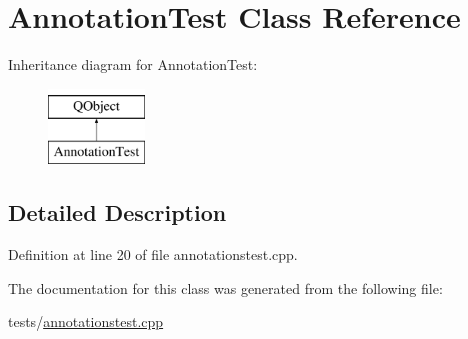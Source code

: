 \hypertarget{classAnnotationTest}{\section{Annotation\+Test Class Reference}
\label{classAnnotationTest}
}
Inheritance diagram for Annotation\+Test\+:\begin{figure}[H]
\begin{center}
\leavevmode
\includegraphics[height=2.000000cm]{classAnnotationTest}
\end{center}
\end{figure}


\subsection{Detailed Description}


Definition at line 20 of file annotationstest.\+cpp.



The documentation for this class was generated from the following file\+:\begin{DoxyCompactItemize}
\item 
tests/\hyperlink{annotationstest_8cpp}{annotationstest.\+cpp}\end{DoxyCompactItemize}
